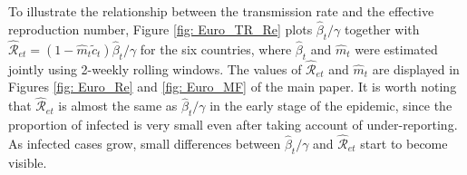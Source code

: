 \documentclass[12pt]{article}
\begin{document}
To illustrate the relationship between the transmission rate and the effective
reproduction number, Figure \ref{fig: Euro_TR_Re} plots $\hat{\beta}%
_{t}/\gamma$ together with $\mathcal{\hat{R}}_{et}=\left(  1-\hat{m}_{t}%
\tilde{c}_{t}\right)  \hat{\beta}_{t}/\gamma$ for the six countries, where
$\hat{\beta}_{t}$ and $\hat{m}_{t}$ were estimated jointly using 2-weekly
rolling windows. The values of $\mathcal{\hat{R}}_{et}$ and $\hat{m}_{t}$ are
displayed in Figures \ref{fig: Euro_Re} and \ref{fig: Euro_MF} of the main
paper. It is worth noting that $\mathcal{\hat{R}}_{et}$ is almost the same as
$\hat{\beta}_{t}/\gamma$ in the early stage of the epidemic, since the
proportion of infected is very small even after taking account of
under-reporting. As infected cases grow, small differences between $\hat
{\beta}_{t}/\gamma$ and $\mathcal{\hat{R}}_{et}$ start to become visible.%
\end{document}
